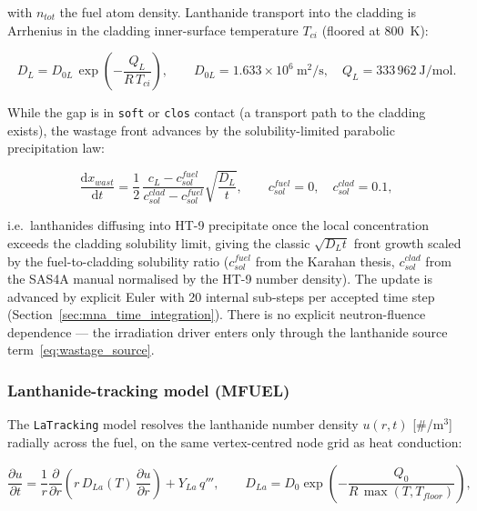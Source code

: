 \begin{refsection}
with $n_{tot}$ the fuel atom density.  Lanthanide transport into the
cladding is Arrhenius in the cladding inner-surface temperature $T_{ci}$
(floored at 800~K):

\begin{equation}
  D_L = D_{0L}\,\exp\!\left(-\frac{Q_L}{R\,T_{ci}}\right),
  \qquad D_{0L} = 1.633\times10^{6}\ \mathrm{m^2/s},
  \quad Q_L = 333\,962\ \mathrm{J/mol}.
  \label{eq:wastage_diff}
\end{equation}

While the gap is in \texttt{soft} or \texttt{clos} contact (a transport
path to the cladding exists), the wastage front advances by the
solubility-limited parabolic precipitation law:

\begin{equation}
  \frac{\mathrm{d}x_{wast}}{\mathrm{d}t}
  = \frac{1}{2}\,
    \frac{c_L - c_{sol}^{fuel}}{c_{sol}^{clad} - c_{sol}^{fuel}}
    \sqrt{\frac{D_L}{t}},
  \qquad c_{sol}^{fuel} = 0, \quad c_{sol}^{clad} = 0.1,
  \label{eq:wastage}
\end{equation}

i.e.\ lanthanides diffusing into HT-9 precipitate once the local
concentration exceeds the cladding solubility limit, giving the classic
$\sqrt{D_L t}$ front growth scaled by the fuel-to-cladding solubility
ratio ($c_{sol}^{fuel}$ from the Karahan thesis, $c_{sol}^{clad}$ from the
SAS4A manual normalised by the HT-9 number density).  The update is
advanced by explicit Euler with 20 internal sub-steps per accepted time
step (Section~\ref{sec:mna_time_integration}).  There is no explicit
neutron-fluence dependence — the irradiation driver enters only through
the lanthanide source term~\eqref{eq:wastage_source}.

\subsubsection{Lanthanide-tracking model (MFUEL)}

The \texttt{LaTracking} model resolves the lanthanide number density
$u(r,t)$ [\#/m$^3$] radially across the fuel, on the same vertex-centred
node grid as heat conduction:

\begin{equation}
  \frac{\partial u}{\partial t}
  = \frac{1}{r}\frac{\partial}{\partial r}
    \!\left(r\,D_{La}(T)\,\frac{\partial u}{\partial r}\right)
  + Y_{La}\,q''',
  \qquad
  D_{La} = D_{0}\exp\!\left(-\frac{Q_{0}}{R\,\max(T, T_{floor})}\right),
  \label{eq:la_diffusion}
\end{equation}


\end{refsection}
